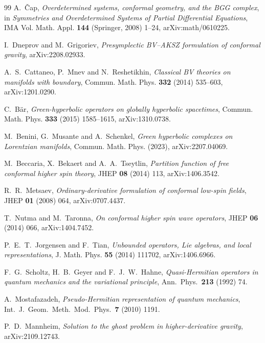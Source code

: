 \documentclass[11pt]{article}
\theoremstyle{remark}
\begin{document}
\begin{thebibliography}{99}
A.~\v{C}ap,
\emph{Overdetermined systems, conformal geometry, and the BGG complex},
in \emph{Symmetries and Overdetermined Systems of Partial Differential
Equations}, IMA Vol. Math. Appl. \textbf{144} (Springer, 2008) 1--24,
arXiv:math/0610225.

I.~Dneprov and M.~Grigoriev,
\emph{Presymplectic BV--AKSZ formulation of conformal gravity},
arXiv:2208.02933.

A.~S.~Cattaneo, P.~Mnev and N.~Reshetikhin,
\emph{Classical BV theories on manifolds with boundary},
Commun. Math. Phys. \textbf{332} (2014) 535--603,
arXiv:1201.0290.

C.~B\"ar,
\emph{Green-hyperbolic operators on globally hyperbolic spacetimes},
Commun. Math. Phys. \textbf{333} (2015) 1585--1615,
arXiv:1310.0738.

M.~Benini, G.~Musante and A.~Schenkel,
\emph{Green hyperbolic complexes on Lorentzian manifolds},
Commun. Math. Phys. (2023), arXiv:2207.04069.

M.~Beccaria, X.~Bekaert and A.~A.~Tseytlin,
\emph{Partition function of free conformal higher spin theory},
JHEP \textbf{08} (2014) 113, arXiv:1406.3542.

R.~R.~Metsaev,
\emph{Ordinary-derivative formulation of conformal low-spin fields},
JHEP \textbf{01} (2008) 064, arXiv:0707.4437.

T.~Nutma and M.~Taronna,
\emph{On conformal higher spin wave operators},
JHEP \textbf{06} (2014) 066, arXiv:1404.7452.

P.~E.~T.~Jorgensen and F.~Tian,
\emph{Unbounded operators, Lie algebras, and local representations},
J. Math. Phys. \textbf{55} (2014) 111702, arXiv:1406.6966.

F.~G.~Scholtz, H.~B.~Geyer and F.~J.~W.~Hahne,
\emph{Quasi-Hermitian operators in quantum mechanics and the variational
principle},
Ann.\ Phys.\ \textbf{213} (1992) 74.

A.~Mostafazadeh,
\emph{Pseudo-Hermitian representation of quantum mechanics},
Int.\ J.\ Geom.\ Meth.\ Mod.\ Phys.\ \textbf{7} (2010) 1191.

P.~D.~Mannheim,
\emph{Solution to the ghost problem in higher-derivative gravity},
arXiv:2109.12743.


\end{thebibliography}
\end{document}

